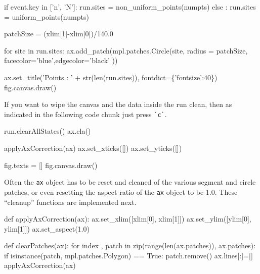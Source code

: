if event.key in ['n', 'N']: 
        run.sites = non_uniform_points(numpts)
else : 
        run.sites = uniform_points(numpts)

patchSize  = (xlim[1]-xlim[0])/140.0

for site in run.sites:      
    ax.add_patch(mpl.patches.Circle(site, radius = patchSize, \\
                 facecolor='blue',edgecolor='black' ))

ax.set_title('Points : ' + str(len(run.sites)), fontdict=\{'fontsize':40\})
fig.canvas.draw()

\nwendcode{}\nwdocspar

If you want to wipe the canvas and the data inside the run clean, then as indicated in the following code
chunk just press \verb|`c`|. 

\nwenddocs{}\endmoddef\nwstartdeflinemarkup{}\nwenddeflinemarkup
run.clearAllStates()
ax.cla()
                                 
applyAxCorrection(ax)
ax.set_xticks([])
ax.set_yticks([])
                                    
fig.texts = []
fig.canvas.draw()
\nwendcode{}\nwdocspar





Often the \verb|ax| object has to be reset and cleaned of the various segment and circle patches, or even resetting the 
aspect ratio of the \verb|ax| object to be 1.0. These ``cleanup'' functions are implemented next. 

\nwenddocs{}\endmoddef\nwstartdeflinemarkup\nwenddeflinemarkup
def applyAxCorrection(ax):
      ax.set_xlim([xlim[0], xlim[1]])
      ax.set_ylim([ylim[0], ylim[1]])
      ax.set_aspect(1.0)

def clearPatches(ax):
    for index , patch in zip(range(len(ax.patches)), ax.patches):
        if isinstance(patch, mpl.patches.Polygon) == True:
            patch.remove()
    ax.lines[:]=[]
    applyAxCorrection(ax)

